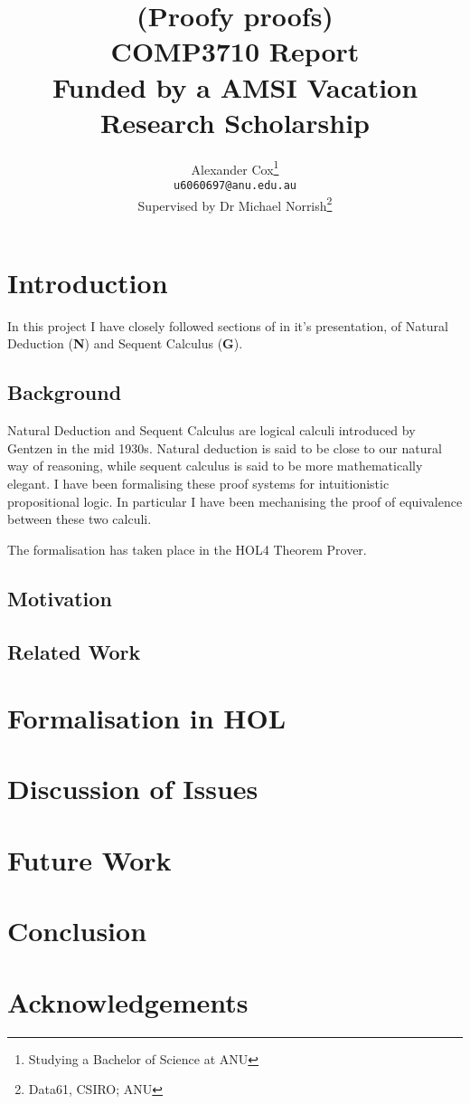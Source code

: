 \documentclass[a4paper]{article}
\title{(Proofy proofs)\\
  \normalsize{} COMP3710 Report\\
  Funded by a AMSI Vacation Research Scholarship}
\author{Alexander Cox\thanks{Studying a Bachelor of Science at ANU}\\
      \small\texttt{u6060697@anu.edu.au}\\
      \normalsize{}Supervised by Dr Michael Norrish\thanks{Data61, CSIRO; ANU}}
\newcommand{\N}{\textbf{N}}
\newcommand{\G}{\textbf{G}}
\theoremstyle{definition}
\theoremstyle{remark}
\begin{document}
\maketitle

\begin{abstract}
\end{abstract}

\section{Introduction}
In this project I have closely followed sections of \textcite{bpt} in it's presentation, of Natural Deduction (\N) and Sequent Calculus (\G).
\subsection{Background}
Natural Deduction and Sequent Calculus are logical calculi introduced by Gentzen in the mid 1930s. Natural deduction is said to be close to our natural way of reasoning, while sequent calculus is said to be more mathematically elegant. I have been formalising these proof systems for intuitionistic propositional logic. In particular I have been mechanising the proof of equivalence between these two calculi.

The formalisation has taken place in the HOL4 Theorem Prover.

\subsection{Motivation}

\subsection{Related Work}
\section{Formalisation in HOL}
\section{Discussion of Issues} %
\section{Future Work}
\section{Conclusion}
\section*{Acknowledgements}
\printbibliography{}
\end{document}
